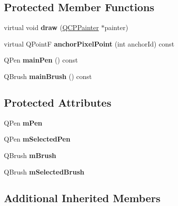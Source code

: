 \subsection*{Protected Member Functions}
\begin{DoxyCompactItemize}
\item 
\hypertarget{class_q_c_p_item_rect_a18cd583638b876cdd50f1a155ec182aa}{}\label{class_q_c_p_item_rect_a18cd583638b876cdd50f1a155ec182aa} 
virtual void {\bfseries draw} (\hyperlink{class_q_c_p_painter}{Q\+C\+P\+Painter} $\ast$painter)
\item 
\hypertarget{class_q_c_p_item_rect_af1c42e6142d1137673335982856d0ea6}{}\label{class_q_c_p_item_rect_af1c42e6142d1137673335982856d0ea6} 
virtual Q\+PointF {\bfseries anchor\+Pixel\+Point} (int anchor\+Id) const
\item 
\hypertarget{class_q_c_p_item_rect_af94d87da501e9429c0e874f1c0369b03}{}\label{class_q_c_p_item_rect_af94d87da501e9429c0e874f1c0369b03} 
Q\+Pen {\bfseries main\+Pen} () const
\item 
\hypertarget{class_q_c_p_item_rect_a8813d2d670835ac9b8000c981b8ea6fe}{}\label{class_q_c_p_item_rect_a8813d2d670835ac9b8000c981b8ea6fe} 
Q\+Brush {\bfseries main\+Brush} () const
\end{DoxyCompactItemize}
\subsection*{Protected Attributes}
\begin{DoxyCompactItemize}
\item 
\hypertarget{class_q_c_p_item_rect_aa0d49323628d6752026056bfb52afd86}{}\label{class_q_c_p_item_rect_aa0d49323628d6752026056bfb52afd86} 
Q\+Pen {\bfseries m\+Pen}
\item 
\hypertarget{class_q_c_p_item_rect_a73cc0bee61de3c67221ec8c7a76a29ed}{}\label{class_q_c_p_item_rect_a73cc0bee61de3c67221ec8c7a76a29ed} 
Q\+Pen {\bfseries m\+Selected\+Pen}
\item 
\hypertarget{class_q_c_p_item_rect_a2d7f207fada27588b3a52b19234d3c2e}{}\label{class_q_c_p_item_rect_a2d7f207fada27588b3a52b19234d3c2e} 
Q\+Brush {\bfseries m\+Brush}
\item 
\hypertarget{class_q_c_p_item_rect_a21b70eee59b6e19ae0bbdf037b13508f}{}\label{class_q_c_p_item_rect_a21b70eee59b6e19ae0bbdf037b13508f} 
Q\+Brush {\bfseries m\+Selected\+Brush}
\end{DoxyCompactItemize}
\subsection*{Additional Inherited Members}


